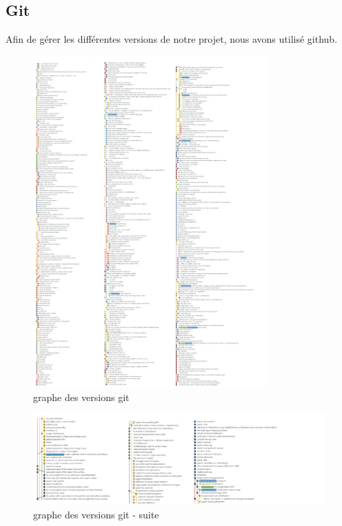 \subsection{Git}

Afin de gérer les différentes versions de notre projet, nous avons utilisé github.



\begin{figure}[h!]
	\centering
	\includegraphics[width=0.8\textwidth]{img/state_git_graph.png}
	\caption{graphe des versions git}
\end{figure}

\newpage
\begin{figure}[h!]
	\centering
	\includegraphics[width=1.0\textwidth]{img/state_git_graph_2.png}
	\caption{graphe des versions git - suite}
	\label{fig:notification}
\end{figure}
